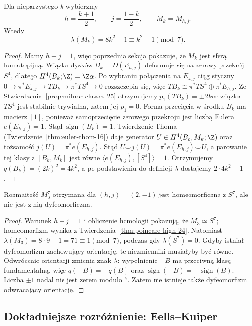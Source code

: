 \begin{stwierdzenie}
\label{prop:milnor-value-25}
Dla nieparzystego $k$ wybierzmy
\[
 h=\frac{k+1}{2},\qquad
 j=\frac{1-k}{2},
 \qquad M_k=M_{h,j}.
\]
Wtedy
\[
 \lambda(M_k)
 =8k^2-1\equiv k^2-1\pmod7.
\]
\end{stwierdzenie}
\begin{proof}
Mamy $h+j=1$, więc
poprzednia sekcja pokazuje,
że $M_k$ jest sferą homotopijną.
Wiązka dysków $B_k=D(E_{h,j})$
deformuje się na zerowy przekrój
$S^4$, dlatego
$H^4(B_k;\Z)=\Z\alpha$.
Po wybraniu połączenia na $E_{h,j}$
ciąg styczny
$0\to\pi^*E_{h,j}\to TB_k
\to\pi^*TS^4\to0$
rozszczepia się, więc
$TB_k\cong\pi^*TS^4\oplus\pi^*E_{h,j}$.
Ze Stwierdzenia~\ref{prop:milnor-classes-25}
otrzymujemy
$p_1(TB_k)=\pm2k\alpha$:
wiązka $TS^4$ jest stabilnie
trywialna, zatem jej $p_1=0$.
Forma przecięcia w środku
$B_k$ ma macierz $[1]$,
ponieważ samoprzecięcie
zerowego przekroju jest liczbą
Eulera $e(E_{h,j})=1$.
Stąd $\operatorname{sign}(B_k)=1$.
Twierdzenie Thoma
(Twierdzenie~\ref{thm:euler-thom-16})
daje generator $U\in H^4(B_k,M_k;\Z)$
oraz tożsamość $j(U)=\pi^*e(E_{h,j})$.
Stąd $U\smile j(U)=
\pi^*e(E_{h,j})\smile U$, a parowanie
tej klasy z $[B_k,M_k]$ jest równe
$\langle e(E_{h,j}),[S^4]\rangle=1$.
Otrzymujemy
$q(B_k)=(2k)^2=4k^2$,
a po podstawieniu do definicji
$\lambda$ dostajemy
$2\cdot4k^2-1$.
\end{proof}

\begin{twierdzenie}
\label{thm:exotic-milnor-25}
Rozmaitość $M_3^7$ otrzymana
dla $(h,j)=(2,-1)$
jest homeomorficzna z $S^7$,
ale nie jest z nią dyfeomorficzna.
\end{twierdzenie}
\begin{proof}
Warunek $h+j=1$ i obliczenie
homologii pokazują, że
$M_3\simeq S^7$; homeomorfizm
wynika z
Twierdzenia~\ref{thm:poincare-high-24}.
Natomiast
$\lambda(M_3)=8\cdot9-1=71
\equiv1\pmod7$, podczas gdy
$\lambda(S^7)=0$.
Gdyby istniał dyfeomorfizm
zachowujący orientację, te
niezmienniki musiałyby być równe.
Odwrócenie orientacji zmienia
znak $\lambda$: wypełnienie $-B$
ma przeciwną klasę fundamentalną,
więc $q(-B)=-q(B)$ oraz
$\operatorname{sign}(-B)
=-\operatorname{sign}(B)$.
Liczba $\pm1$
nadal nie jest zerem modulo $7$.
Zatem nie istnieje także
dyfeomorfizm odwracający
orientację.
\end{proof}

\subsection*{Dokładniejsze rozróżnienie: Eells--Kuiper}

